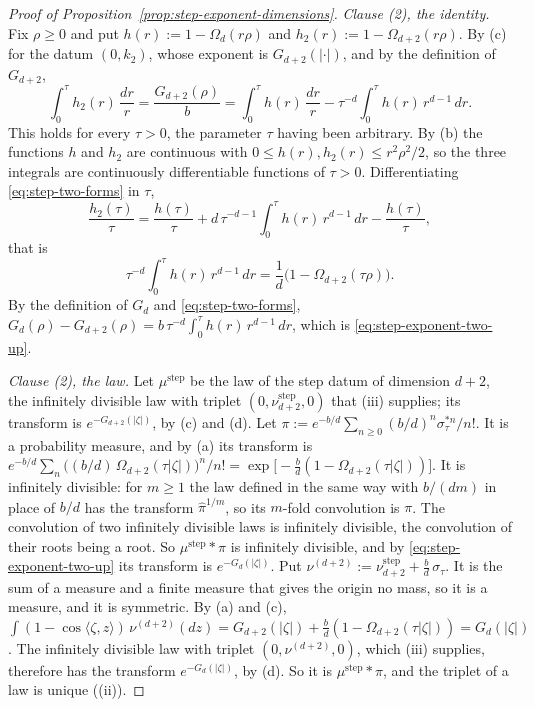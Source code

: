 \begin{proof}[Proof of Proposition~\ref{prop:step-exponent-dimensions}]
\emph{Clause (2), the identity.} Fix $\rho \ge 0$ and put $h(r) := 1 - \Omega_d(r\rho)$ and
$h_2(r) := 1 - \Omega_{d+2}(r\rho)$. By (c) for the datum $(0,k_2)$, whose exponent is
$G_{d+2}(|\cdot|)$, and by the definition of $G_{d+2}$,
\begin{equation}\label{eq:step-two-forms}
  \int_0^\tau h_2(r)\,\frac{dr}{r} = \frac{G_{d+2}(\rho)}{b}
   = \int_0^\tau h(r)\,\frac{dr}{r} - \tau^{-d}\int_0^\tau h(r)\,r^{d-1}\,dr .
\end{equation}
This holds for every $\tau > 0$, the parameter $\tau$ having been arbitrary. By (b) the
functions $h$ and $h_2$ are continuous with $0 \le h(r), h_2(r) \le r^2\rho^2/2$, so the three
integrals are continuously differentiable functions of $\tau > 0$. Differentiating
\ref{eq:step-two-forms} in $\tau$,
\[
  \frac{h_2(\tau)}{\tau} = \frac{h(\tau)}{\tau} + d\,\tau^{-d-1}\int_0^\tau h(r)\,r^{d-1}\,dr
     - \frac{h(\tau)}{\tau} ,
\]
that is
\[
  \tau^{-d}\int_0^\tau h(r)\,r^{d-1}\,dr = \frac{1}{d}\bigl(1 - \Omega_{d+2}(\tau\rho)\bigr) .
\]
By the definition of $G_d$ and \ref{eq:step-two-forms},
$G_d(\rho) - G_{d+2}(\rho) = b\,\tau^{-d}\int_0^\tau h(r)\,r^{d-1}\,dr$, which is
\ref{eq:step-exponent-two-up}.

\emph{Clause (2), the law.} Let $\mu^{\mathrm{step}}$ be the law of the step datum of dimension
$d + 2$, the infinitely divisible law with triplet $(0,\nu^{\mathrm{step}}_{d+2},0)$ that
(iii) supplies; its transform is $e^{-G_{d+2}(|\zeta|)}$, by (c) and (d). Let
$\pi := e^{-b/d}\sum_{n \ge 0}(b/d)^n\sigma_\tau^{*n}/n!$. It is a probability measure, and by
(a) its transform is
$e^{-b/d}\sum_n\bigl((b/d)\,\Omega_{d+2}(\tau|\zeta|)\bigr)^n/n!
= \exp\bigl[-\tfrac{b}{d}(1 - \Omega_{d+2}(\tau|\zeta|))\bigr]$. It is infinitely divisible: for
$m \ge 1$ the law defined in the same way with $b/(dm)$ in place of $b/d$ has the transform
$\widehat\pi^{1/m}$, so its $m$-fold convolution is $\pi$. The convolution of two infinitely
divisible laws is infinitely divisible, the convolution of their roots being a root. So
$\mu^{\mathrm{step}} * \pi$ is infinitely divisible, and by \ref{eq:step-exponent-two-up} its
transform is $e^{-G_d(|\zeta|)}$. Put
$\nu^{(d+2)} := \nu^{\mathrm{step}}_{d+2} + \tfrac{b}{d}\,\sigma_\tau$. It is the sum of a
\Levy{} measure and a finite measure that gives the origin no mass, so it is a \Levy{} measure,
and it is symmetric. By (a) and (c),
$\int(1 - \cos\langle\zeta,z\rangle)\,\nu^{(d+2)}(dz) = G_{d+2}(|\zeta|)
+ \tfrac{b}{d}(1 - \Omega_{d+2}(\tau|\zeta|)) = G_d(|\zeta|)$. The infinitely divisible law with
triplet $(0,\nu^{(d+2)},0)$, which (iii) supplies, therefore has the transform
$e^{-G_d(|\zeta|)}$, by (d). So it is $\mu^{\mathrm{step}} * \pi$, and the triplet of a law is
unique ((ii)).


\end{proof}

